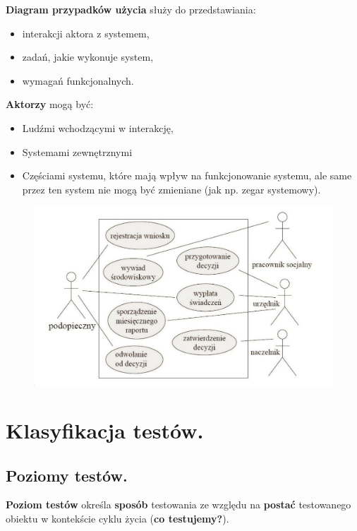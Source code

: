 \documentclass[12pt]{article}
\begin{document}
    \begin{definition}
        \textbf{Diagram przypadków użycia} służy do przedstawiania:
        \begin{itemize}
            \item interakcji aktora z systemem,
            \item zadań, jakie wykonuje system,
            \item wymagań funkcjonalnych.
        \end{itemize}


        \textbf{Aktorzy} mogą być:
        \begin{itemize}
            \item Ludźmi wchodzącymi w interakcję,
            \item Systemami zewnętrznymi
            \item Częściami systemu, które mają wpływ na funkcjonowanie systemu, ale same przez ten system nie mogą
            być zmieniane (jak np. zegar systemowy).
        \end{itemize}
    \end{definition}

    \begin{figure}[H]
        \includegraphics[width=\linewidth]{uml_pu.png}
    \end{figure}

    \newpage

    \section{Klasyfikacja testów.}

    \subsection{Poziomy testów.}
    \begin{definition}
        \textbf{Poziom testów} określa \textbf{sposób} testowania ze względu na \textbf{postać}
        testowanego obiektu w kontekście cyklu życia (\textbf{co testujemy?}).
    \end{definition}
\end{document}
